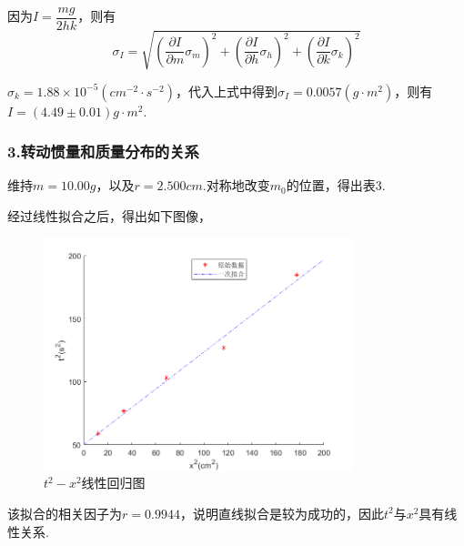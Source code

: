 \documentclass[12pt,a4paper,UTF8]{ctexart}
\begin{document}
\par
因为$I=\dfrac{mg}{2hk}$，则有
\begin{equation*}
	\sigma_I=\sqrt{(\frac{\partial I}{\partial m}\sigma_m)^2+(\frac{\partial I}{\partial h}\sigma_h)^2+(\frac{\partial I}{\partial k}\sigma_k)^2}
\end{equation*}
\par
$\sigma_k=1.88\times10^{-5}(cm^{-2}\cdot s^{-2})$，代入上式中得到$\sigma_I=0.0057(g\cdot m^2)$，则有$I=(4.49\pm0.01)g\cdot m^2$.
\subsubsection*{3.转动惯量和质量分布的关系}
维持$m=10.00g$，以及$r=2.500cm$.对称地改变$m_0$的位置，得出表3.
\begin{table}[htbp]
\centering
\caption{实验三数据表}
\end{table}
\par
经过线性拟合之后，得出如下图像，
\begin{figure}[htbp]
		\centering
		\includegraphics[width=9cm]{3.png}
		\caption{$t^2-x^2$线性回归图}
\end{figure}
\par
该拟合的相关因子为$r=0.9944$，说明直线拟合是较为成功的，因此$t^2$与$x^2$具有线性关系.
\end{document}
